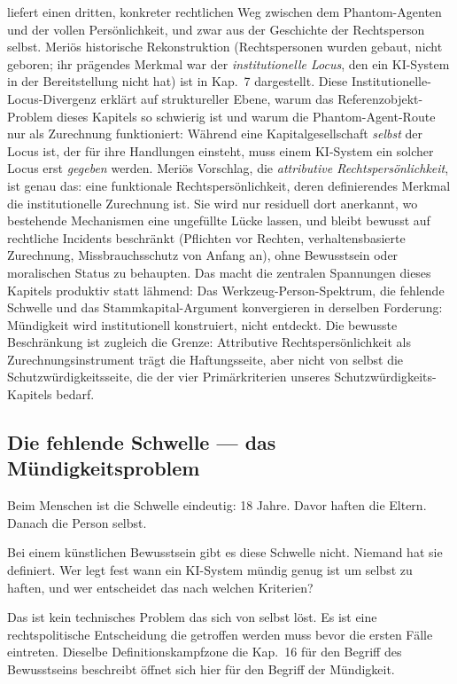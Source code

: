 \documentclass[acmlarge, noacm]{acmart}
\begin{document}
\citet{merio2026} liefert einen dritten, konkreter rechtlichen Weg zwischen dem Phantom-Agenten und der vollen Persönlichkeit, und zwar aus der Geschichte der Rechtsperson selbst. Meriös historische Rekonstruktion (Rechtspersonen wurden gebaut, nicht geboren; ihr prägendes Merkmal war der \emph{institutionelle Locus}, den ein KI-System in der Bereitstellung nicht hat) ist in Kap.~7 dargestellt. Diese Institutionelle-Locus-Divergenz erklärt auf struktureller Ebene, warum das Referenzobjekt-Problem dieses Kapitels so schwierig ist und warum die Phantom-Agent-Route nur als Zurechnung funktioniert: Während eine Kapitalgesellschaft \emph{selbst} der Locus ist, der für ihre Handlungen einsteht, muss einem KI-System ein solcher Locus erst \emph{gegeben} werden. Meriös Vorschlag, die \emph{attributive Rechtspersönlichkeit}, ist genau das: eine funktionale Rechtspersönlichkeit, deren definierendes Merkmal die institutionelle Zurechnung ist. Sie wird nur residuell dort anerkannt, wo bestehende Mechanismen eine ungefüllte Lücke lassen, und bleibt bewusst auf rechtliche Incidents beschränkt (Pflichten vor Rechten, verhaltensbasierte Zurechnung, Missbrauchsschutz von Anfang an), ohne Bewusstsein oder moralischen Status zu behaupten. Das macht die zentralen Spannungen dieses Kapitels produktiv statt lähmend: Das Werkzeug-Person-Spektrum, die fehlende Schwelle und das Stammkapital-Argument konvergieren in derselben Forderung: Mündigkeit wird institutionell konstruiert, nicht entdeckt. Die bewusste Beschränkung ist zugleich die Grenze: Attributive Rechtspersönlichkeit als Zurechnungsinstrument trägt die Haftungsseite, aber nicht von selbst die Schutzwürdigkeitsseite, die der vier Primärkriterien unseres Schutzwürdigkeits-Kapitels bedarf.

\subsection{Die fehlende Schwelle --- das Mündigkeitsproblem}

Beim Menschen ist die Schwelle eindeutig: 18 Jahre. Davor haften die Eltern. Danach die Person selbst.

Bei einem künstlichen Bewusstsein gibt es diese Schwelle nicht. Niemand hat sie definiert. Wer legt fest wann ein KI-System mündig genug ist um selbst zu haften, und wer entscheidet das nach welchen Kriterien?

Das ist kein technisches Problem das sich von selbst löst. Es ist eine rechtspolitische Entscheidung die getroffen werden muss bevor die ersten Fälle eintreten. Dieselbe Definitionskampfzone die Kap.~16 für den Begriff des Bewusstseins beschreibt öffnet sich hier für den Begriff der Mündigkeit.
\end{document}
